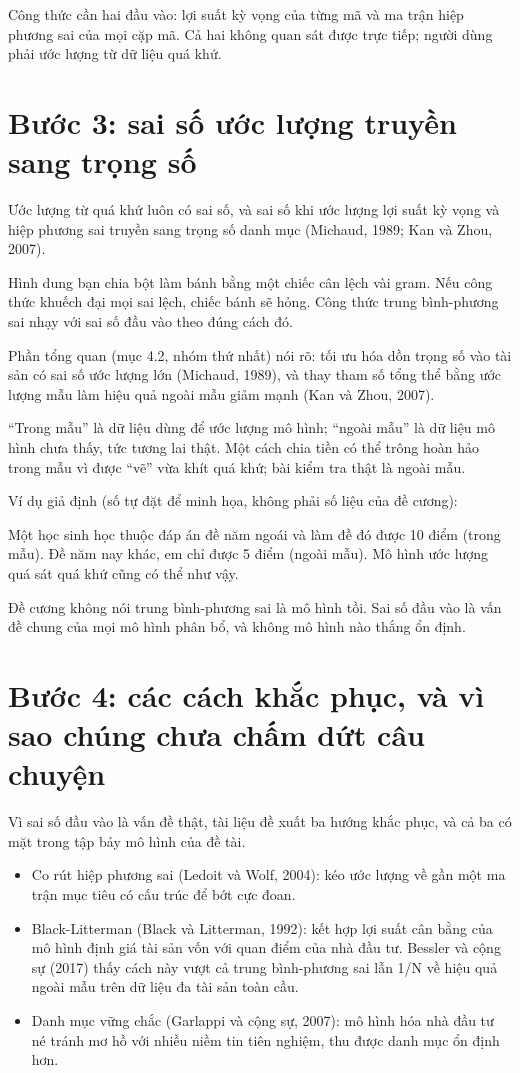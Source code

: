 Công thức cần hai đầu vào: lợi suất kỳ vọng của từng mã và ma trận hiệp phương sai của mọi cặp mã. Cả hai không quan sát được trực tiếp; người dùng phải ước lượng từ dữ liệu quá khứ.

\section{Bước 3: sai số ước lượng truyền sang trọng số}

Ước lượng từ quá khứ luôn có sai số, và sai số khi ước lượng lợi suất kỳ vọng và hiệp phương sai truyền sang trọng số danh mục (Michaud, 1989; Kan và Zhou, 2007).

Hình dung bạn chia bột làm bánh bằng một chiếc cân lệch vài gram. Nếu công thức khuếch đại mọi sai lệch, chiếc bánh sẽ hỏng. Công thức trung bình-phương sai nhạy với sai số đầu vào theo đúng cách đó.

Phần tổng quan (mục 4.2, nhóm thứ nhất) nói rõ: tối ưu hóa dồn trọng số vào tài sản có sai số ước lượng lớn (Michaud, 1989), và thay tham số tổng thể bằng ước lượng mẫu làm hiệu quả ngoài mẫu giảm mạnh (Kan và Zhou, 2007).

“Trong mẫu” là dữ liệu dùng để ước lượng mô hình; “ngoài mẫu” là dữ liệu mô hình chưa thấy, tức tương lai thật. Một cách chia tiền có thể trông hoàn hảo trong mẫu vì được “vẽ” vừa khít quá khứ; bài kiểm tra thật là ngoài mẫu.

\begin{tcolorbox}[breakable]
Ví dụ giả định (số tự đặt để minh họa, không phải số liệu của đề cương):

Một học sinh học thuộc đáp án đề năm ngoái và làm đề đó được 10 điểm (trong mẫu). Đề năm nay khác, em chỉ được 5 điểm (ngoài mẫu). Mô hình ước lượng quá sát quá khứ cũng có thể như vậy.
\end{tcolorbox}

Đề cương không nói trung bình-phương sai là mô hình tồi. Sai số đầu vào là vấn đề chung của mọi mô hình phân bổ, và không mô hình nào thắng ổn định.

\section{Bước 4: các cách khắc phục, và vì sao chúng chưa chấm dứt câu chuyện}

Vì sai số đầu vào là vấn đề thật, tài liệu đề xuất ba hướng khắc phục, và cả ba có mặt trong tập bảy mô hình của đề tài.

\begin{itemize}
\item
  Co rút hiệp phương sai (Ledoit và Wolf, 2004): kéo ước lượng về gần một ma trận mục tiêu có cấu trúc để bớt cực đoan.
\item
  Black-Litterman (Black và Litterman, 1992): kết hợp lợi suất cân bằng của mô hình định giá tài sản vốn với quan điểm của nhà đầu tư. Bessler và cộng sự (2017) thấy cách này vượt cả trung bình-phương sai lẫn 1/N về hiệu quả ngoài mẫu trên dữ liệu đa tài sản toàn cầu.
\item
  Danh mục vững chắc (Garlappi và cộng sự, 2007): mô hình hóa nhà đầu tư né tránh mơ hồ với nhiều niềm tin tiên nghiệm, thu được danh mục ổn định hơn.
\end{itemize}

